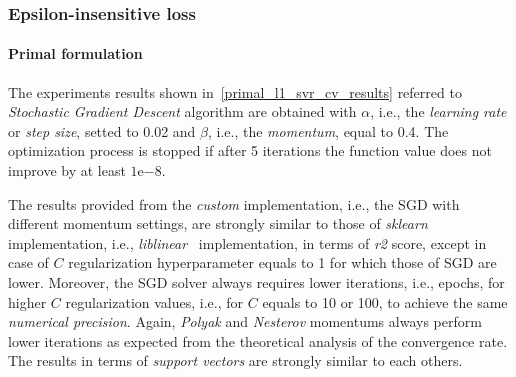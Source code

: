 \subsubsection{Epsilon-insensitive loss}

\paragraph{Primal formulation}

The experiments results shown in~\ref{primal_l1_svr_cv_results} referred to \emph{Stochastic Gradient Descent} algorithm are obtained with $\alpha$, i.e., the \emph{learning rate} or \emph{step size}, setted to 0.02 and $\beta$, i.e., the \emph{momentum}, equal to 0.4. The optimization process is stopped if after 5 iterations the function value does not improve by at least $1\mathrm{e}{-8}$.



The results provided from the \emph{custom} implementation, i.e., the SGD with different momentum settings, are strongly similar to those of \emph{sklearn} implementation, i.e., \emph{liblinear}~\cite{fan2008liblinear} implementation, in terms of \emph{r2} score, except in case of $C$ regularization hyperparameter equals to 1 for which those of SGD are lower. Moreover, the SGD solver always requires lower iterations, i.e., epochs, for higher $C$ regularization values, i.e., for $C$ equals to 10 or 100, to achieve the same \emph{numerical precision}. Again, \emph{Polyak} and \emph{Nesterov} momentums always perform lower iterations as expected from the theoretical analysis of the convergence rate. The results in terms of \emph{support vectors} are strongly similar to each others.

